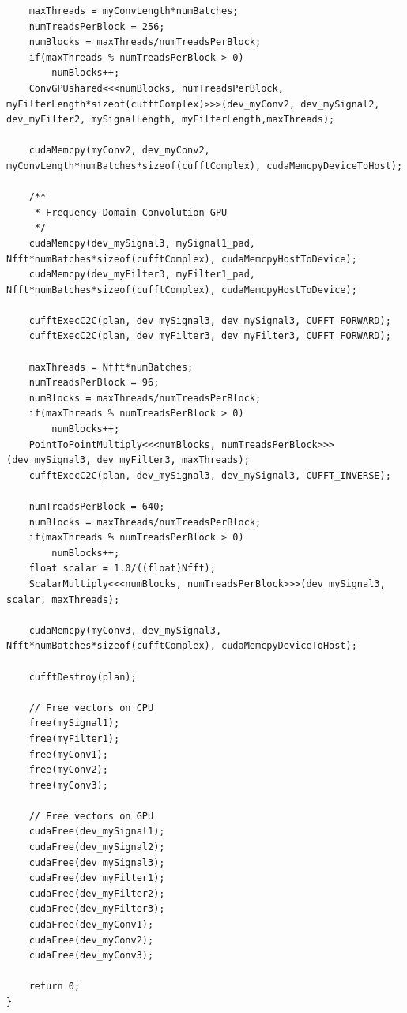 \begin{lstlisting}
	maxThreads = myConvLength*numBatches;
	numTreadsPerBlock = 256;
	numBlocks = maxThreads/numTreadsPerBlock;
	if(maxThreads % numTreadsPerBlock > 0)
		numBlocks++;
	ConvGPUshared<<<numBlocks, numTreadsPerBlock, myFilterLength*sizeof(cufftComplex)>>>(dev_myConv2, dev_mySignal2, dev_myFilter2, mySignalLength, myFilterLength,maxThreads);

	cudaMemcpy(myConv2, dev_myConv2, myConvLength*numBatches*sizeof(cufftComplex), cudaMemcpyDeviceToHost);

	/**
	 * Frequency Domain Convolution GPU
	 */
	cudaMemcpy(dev_mySignal3, mySignal1_pad, Nfft*numBatches*sizeof(cufftComplex), cudaMemcpyHostToDevice);
	cudaMemcpy(dev_myFilter3, myFilter1_pad, Nfft*numBatches*sizeof(cufftComplex), cudaMemcpyHostToDevice);

	cufftExecC2C(plan, dev_mySignal3, dev_mySignal3, CUFFT_FORWARD);
	cufftExecC2C(plan, dev_myFilter3, dev_myFilter3, CUFFT_FORWARD);

	maxThreads = Nfft*numBatches;
	numTreadsPerBlock = 96;
	numBlocks = maxThreads/numTreadsPerBlock;
	if(maxThreads % numTreadsPerBlock > 0)
		numBlocks++;
	PointToPointMultiply<<<numBlocks, numTreadsPerBlock>>>(dev_mySignal3, dev_myFilter3, maxThreads);
	cufftExecC2C(plan, dev_mySignal3, dev_mySignal3, CUFFT_INVERSE);

	numTreadsPerBlock = 640;
	numBlocks = maxThreads/numTreadsPerBlock;
	if(maxThreads % numTreadsPerBlock > 0)
		numBlocks++;
	float scalar = 1.0/((float)Nfft);
	ScalarMultiply<<<numBlocks, numTreadsPerBlock>>>(dev_mySignal3, scalar, maxThreads);

	cudaMemcpy(myConv3, dev_mySignal3, Nfft*numBatches*sizeof(cufftComplex), cudaMemcpyDeviceToHost);

	cufftDestroy(plan);

	// Free vectors on CPU
	free(mySignal1);
	free(myFilter1);
	free(myConv1);
	free(myConv2);
	free(myConv3);

	// Free vectors on GPU
	cudaFree(dev_mySignal1);
	cudaFree(dev_mySignal2);
	cudaFree(dev_mySignal3);
	cudaFree(dev_myFilter1);
	cudaFree(dev_myFilter2);
	cudaFree(dev_myFilter3);
	cudaFree(dev_myConv1);
	cudaFree(dev_myConv2);
	cudaFree(dev_myConv3);

	return 0;
}
\end{lstlisting}
\doublespacing
